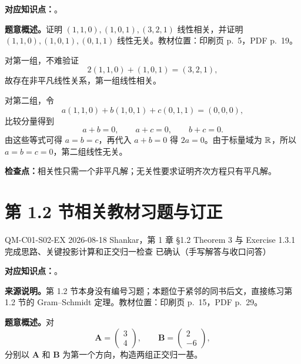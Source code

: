 
\textbf{对应知识点：}。

\textbf{题意概述。}证明 $(1,1,0),(1,0,1),(3,2,1)$ 线性相关，并证明 $(1,1,0),(1,0,1),(0,1,1)$ 线性无关。教材位置：印刷页 p.~5，PDF p.~19。

\begin{checkedsolution}
对第一组，不难验证
\[
  2(1,1,0)+(1,0,1)=(3,2,1),
\]
故存在非平凡线性关系，第一组线性相关。

对第二组，令
\[
  a(1,1,0)+b(1,0,1)+c(0,1,1)=(0,0,0),
\]
比较分量得到
\[
  a+b=0,\qquad a+c=0,\qquad b+c=0.
\]
由这些等式可得 $a=b=c$，再代入 $a+b=0$ 得 $2a=0$。由于标量域为 $\mathbb{R}$，所以 $a=b=c=0$，第二组线性无关。
\end{checkedsolution}

\textbf{检查点：}相关性只需一个非平凡解；无关性要求证明齐次方程只有平凡解。

\section{第 1.2 节相关教材习题与订正}
\label{exercise-set:QM-C01-S02}

\exercisemeta
  {QM-C01-S02-EX}
  {2026-08-18}
  {Shankar，第 1 章 \S 1.2 Theorem 3 与 Exercise 1.3.1}
  {完成思路、关键投影计算和正交归一检查}
  {已确认（手写解答与收口问答）}


\textbf{对应知识点：}。

\textbf{来源说明。}第 1.2 节本身没有编号习题；本题位于紧邻的同书后文，直接练习第 1.2 节的 Gram--Schmidt 定理。教材位置：印刷页 p.~15，PDF p.~29。

\textbf{题意概述。}对
\[
  \bm A=\begin{pmatrix}3\\4\end{pmatrix},
  \qquad
  \bm B=\begin{pmatrix}2\\-6\end{pmatrix},
\]
分别以 $\bm A$ 和 $\bm B$ 为第一个方向，构造两组正交归一基。

